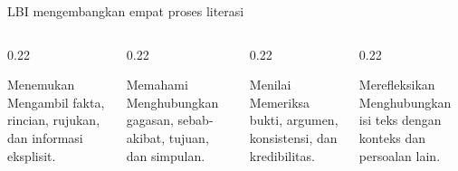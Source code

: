 \begin{frame}{LBI mengembangkan empat proses literasi}
  \begin{columns}[T,onlytextwidth]
    \begin{column}{0.22\textwidth}
      \begin{block}{Menemukan}
        Mengambil fakta, rincian, rujukan, dan informasi eksplisit.
      \end{block}
    \end{column}
    \begin{column}{0.22\textwidth}
      \begin{block}{Memahami}
        Menghubungkan gagasan, sebab-akibat, tujuan, dan simpulan.
      \end{block}
    \end{column}
    \begin{column}{0.22\textwidth}
      \begin{block}{Menilai}
        Memeriksa bukti, argumen, konsistensi, dan kredibilitas.
      \end{block}
    \end{column}
    \begin{column}{0.22\textwidth}
      \begin{block}{Merefleksikan}
        Menghubungkan isi teks dengan konteks dan persoalan lain.
      \end{block}
    \end{column}
  \end{columns}
  \vspace{0.28cm}
\end{frame}

